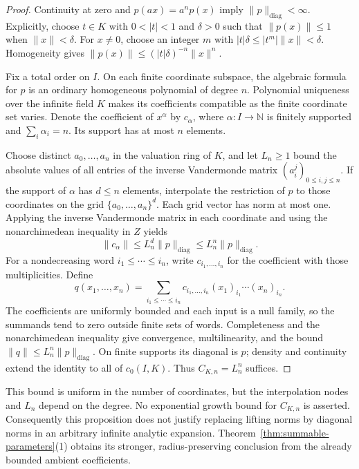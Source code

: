 \documentclass[11pt]{amsart}
\theoremstyle{definition}
\theoremstyle{remark}
\numberwithin{equation}{section}
\newcommand{\N}{\mathbb N}
\newcommand{\abs}[1]{\lvert #1\rvert}
\newcommand{\norm}[1]{\lVert #1\rVert}
\begin{document}
\begin{proof}
Continuity at zero and $p(ax)=a^np(x)$ imply $\norm p_{\mathrm{diag}}<\infty$.
Explicitly, choose $t\in K$ with $0<\abs t<1$ and $\delta>0$ such that $\norm{p(x)}\le1$
when $\norm x<\delta$. For $x\ne0$, choose an integer $m$ with
$\abs t\delta\le\abs{t^m}\norm x<\delta$. Homogeneity gives
$\norm{p(x)}\le(\abs t\delta)^{-n}\norm x^n$.

Fix a total order on $I$. On each finite coordinate subspace, the algebraic formula for $p$ is an
ordinary homogeneous polynomial of degree $n$. Polynomial uniqueness over the infinite field $K$
makes its coefficients compatible as the finite coordinate set varies. Denote the coefficient of
$x^\alpha$ by $c_\alpha$, where $\alpha\colon I\to\N$ is finitely supported and $\sum_i\alpha_i=n$.
Its support has at most $n$ elements.

Choose distinct $a_0,\ldots,a_n$ in the valuation ring of $K$, and let $L_n\ge1$ bound the absolute
values of all entries of the inverse Vandermonde matrix $(a_i^j)_{0\le i,j\le n}$.
If the support of $\alpha$ has $d\le n$ elements, interpolate the restriction of $p$ to those
coordinates on the grid $\{a_0,\ldots,a_n\}^d$. Each grid vector has norm at most one. Applying the
inverse Vandermonde matrix in each coordinate and using the nonarchimedean inequality in $Z$ yields
\[
 \norm{c_\alpha}\le L_n^d\norm p_{\mathrm{diag}}
 \le L_n^n\norm p_{\mathrm{diag}}.
\]
For a nondecreasing word $i_1\le\cdots\le i_n$, write $c_{i_1,\ldots,i_n}$ for the coefficient
with those multiplicities. Define
\[
 q(x_1,\ldots,x_n)=
 \sum_{i_1\le\cdots\le i_n}
 c_{i_1,\ldots,i_n}(x_1)_{i_1}\cdots(x_n)_{i_n}.
\]
The coefficients are uniformly bounded and each input is a null family, so the summands tend to zero
outside finite sets of words. Completeness and the nonarchimedean inequality give convergence,
multilinearity, and the bound $\norm q\le L_n^n\norm p_{\mathrm{diag}}$.
On finite supports its diagonal is $p$; density and continuity extend the identity to all of $c_0(I,K)$.
Thus $C_{K,n}=L_n^n$ suffices.
\end{proof}

This bound is uniform in the number of coordinates, but the interpolation nodes and $L_n$ depend on
the degree. No exponential growth bound for $C_{K,n}$ is asserted. Consequently this proposition does
not justify replacing lifting norms by diagonal norms in an arbitrary infinite analytic expansion.
Theorem~\ref{thm:summable-parameters}(1) obtains its stronger, radius-preserving conclusion from the
already bounded ambient coefficients.
\end{document}
